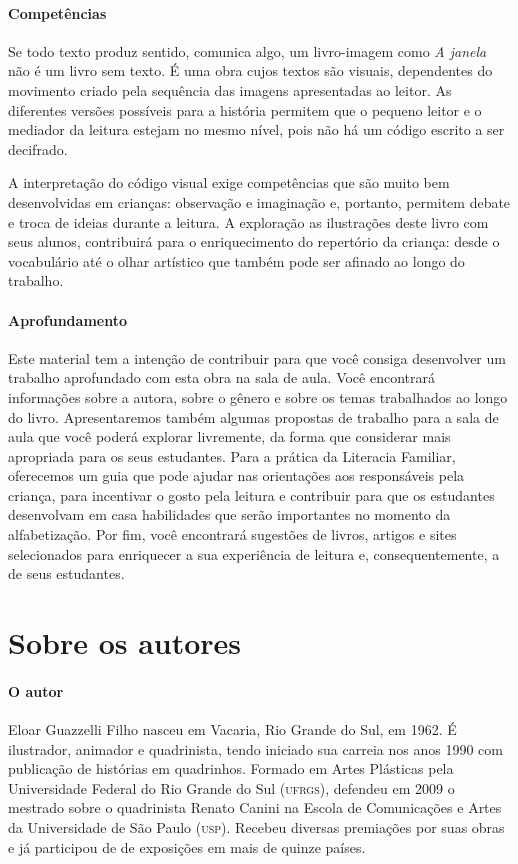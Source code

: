 \documentclass[11pt]{extarticle}
\begin{document}
\paragraph{Competências}
Se todo texto produz sentido, comunica algo, 
um livro-imagem como \textit{A janela} não é um livro sem texto. É uma 
obra cujos textos são visuais, dependentes do movimento criado pela 
sequência das imagens apresentadas ao leitor. As diferentes versões possíveis 
para a história permitem que o pequeno leitor e o mediador da leitura estejam 
no mesmo nível, pois não há um código escrito a ser decifrado. 

A interpretação do código visual 
exige competências que são muito bem desenvolvidas em crianças: 
observação e imaginação e, portanto, permitem debate e troca de ideias durante 
a leitura. A exploração as ilustrações deste livro com seus alunos, contribuirá 
para o enriquecimento do repertório da criança: desde o vocabulário até o 
olhar artístico que também pode ser afinado ao longo do trabalho.


\paragraph{Aprofundamento} Este material tem a 
intenção de contribuir para que você consiga desenvolver um trabalho aprofundado 
com esta obra na sala de aula. Você encontrará informações sobre a autora, sobre 
o gênero e sobre os temas trabalhados ao longo do livro. Apresentaremos também 
algumas propostas de trabalho para a sala de aula que você poderá explorar livremente, 
da forma que considerar mais apropriada para os seus estudantes. Para a prática 
da Literacia Familiar, oferecemos um guia que pode ajudar nas orientações aos 
responsáveis pela criança, para incentivar o gosto pela leitura e contribuir para 
que os estudantes desenvolvam em casa habilidades que serão importantes no momento 
da alfabetização. Por fim, você encontrará sugestões de livros, artigos e sites 
selecionados para enriquecer a sua experiência de leitura e, 
consequentemente, a de seus estudantes.



\section{Sobre os autores}

\paragraph{O autor} Eloar Guazzelli Filho nasceu em Vacaria, Rio Grande do Sul, em 1962. É ilustrador, animador e quadrinista, tendo iniciado sua carreia nos anos 1990 com  publicação de histórias em quadrinhos.
Formado em Artes Plásticas pela Universidade Federal do Rio Grande do Sul (\textsc{ufrgs}), defendeu em 2009 o mestrado sobre o quadrinista Renato Canini na Escola de Comunicações e Artes da Universidade de São Paulo (\textsc{usp}). Recebeu diversas premiações por suas obras e já participou de de exposições em mais de quinze países.
\end{document}
